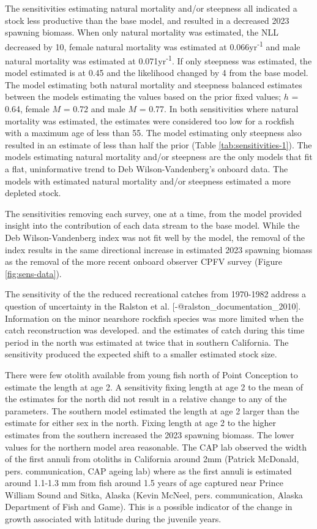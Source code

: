 \documentclass[11pt,
  letterpaper,
]{article}
\begin{document}
The sensitivities estimating natural mortality and/or steepness all indicated a stock less productive than the base model, and resulted in a decreased 2023 spawning biomass. When only natural mortality was estimated, the NLL decreased by 10, female natural mortality was estimated at 0.066yr\textsuperscript{-1} and male natural mortality was estimated at 0.071yr\textsuperscript{-1}. If only steepness was estimated, the model estimated is at 0.45 and the likelihood changed by 4 from the base model. The model estimating both natural mortality and steepness balanced estimates between the models estimating the values based on the prior fixed values; \(h\) = 0.64, female \(M\) = 0.72 and male \(M\) = 0.77. In both sensitivities where natural mortality was estimated, the estimates were considered too low for a rockfish with a maximum age of less than 55. The model estimating only steepness also resulted in an estimate of less than half the prior (Table \ref{tab:sensitivities-1}). The models estimating natural mortality and/or steepness are the only models that fit a flat, uninformative trend to Deb Wilson-Vandenberg's onboard data. The models with estimated natural mortality and/or steepness estimated a more depleted stock.

The sensitivities removing each survey, one at a time, from the model provided insight into the contribution of each data stream to the base model. While the Deb Wilson-Vandenberg index was not fit well by the model, the removal of the index results in the same directional increase in estimated 2023 spawning biomass as the removal of the more recent onboard observer CPFV survey (Figure \ref{fig:sens-data}).

The sensitivity of the the reduced recreational catches from 1970-1982 address a question of uncertainty in the Ralston et al. {[}-@ralston\_documentation\_2010{]}. Information on the minor nearshore rockfish species was more limited when the catch reconstruction was developed. and the estimates of catch during this time period in the north was estimated at twice that in southern California. The sensitivity produced the expected shift to a smaller estimated stock size.

There were few otolith available from young fish north of Point Conception to estimate the length at age 2. A sensitivity fixing length at age 2 to the mean of the estimates for the north did not result in a relative change to any of the parameters. The southern model estimated the length at age 2 larger than the estimate for either sex in the north. Fixing length at age 2 to the higher estimates from the southern increased the 2023 spawning biomass. The lower values for the northern model area reasonable. The CAP lab observed the width of the first annuli from otoliths in California around 2mm (Patrick McDonald, pers. communication, CAP ageing lab) where as the first annuli is estimated around 1.1-1.3 mm from fish around 1.5 years of age captured near Prince William Sound and Sitka, Alaska (Kevin McNeel, pers. communication, Alaska Department of Fish and Game). This is a possible indicator of the change in growth associated with latitude during the juvenile years.
\end{document}
